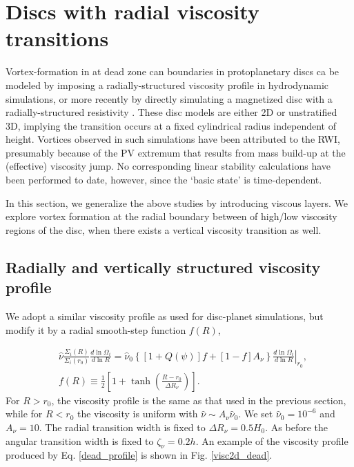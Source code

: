 \section{Discs with radial viscosity transitions}\label{dead}
Vortex-formation in at dead zone can boundaries in protoplanetary
discs ca be modeled by imposing a radially-structured viscosity
profile \citep{varniere06,crespe11} in  hydrodynamic simulations, or
more recently by directly simulating a magnetized disc with a
radially-structured resistivity \citep{lyra12}. These disc models are
either 2D or unstratified 3D,  implying the transition occurs at a
fixed cylindrical radius independent of height. Vortices observed in
such simulations have been attributed to the RWI, presumably because
of the PV extremum that results from mass build-up at the (effective)
viscosity jump. No corresponding linear stability
calculations have been performed to date, however, since the `basic
state' is time-dependent.       

In this section, we generalize the above studies by  
introducing viscous layers. We explore vortex formation at the
radial boundary between of high/low viscosity regions of the disc, 
when there exists a vertical viscosity transition as well.     

\subsection{Radially and vertically structured viscosity profile}
We adopt a similar viscosity profile as used for disc-planet
simulations, but modify it by a radial smooth-step function $f(R)$, 

\begin{align}\label{dead_profile}
  &\hat{\nu}\frac{\Sigma_i(R)}{\Sigma_i(r_0)}\frac{d\ln{\Omega_i}}{d\ln{R}} = 
  \hat{\nu}_0\left\{ \left[1+Q(\psi)\right]f + \left[ 1-
    f\right]A_\nu\right\}%
  \left.\frac{d\ln{\Omega_i}}{d\ln{R}}\right|_{r_0},\\
  &f(R) \equiv \frac{1}{2}\left[ 1 + \tanh{\left(\frac{R-r_0}{\Delta R_\nu}\right)} \right].
\end{align}
For $R>r_0$, the viscosity profile is the same as that used in the
previous section, while for $R<r_0$ the viscosity is uniform with 
$\hat{\nu}\sim A_\nu\hat{\nu}_0$. We set $\hat{\nu}_0=10^{-6}$ and
$A_\nu=10$. The radial transition width is fixed to $\Delta R_\nu =
0.5H_0$. As before the angular transition width is fixed to
$\zeta_\nu=0.2h$. An example of the viscosity profile produced by
Eq. \ref{dead_profile} is shown in Fig. \ref{visc2d_dead}.   

